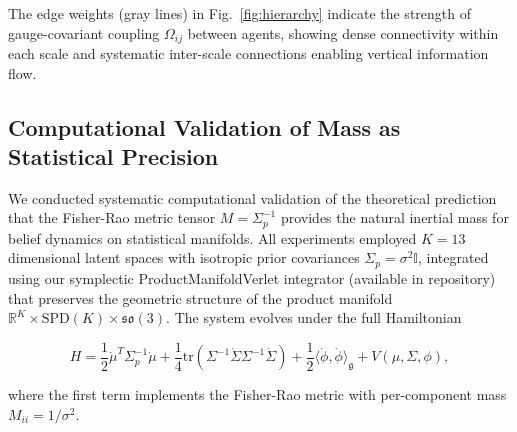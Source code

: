 \documentclass[11pt]{article}
\begin{document}
The edge weights (gray lines) in Fig.~\ref{fig:hierarchy} indicate the strength of gauge-covariant coupling $\Omega_{ij}$ between agents, showing dense connectivity within each scale and systematic inter-scale connections enabling vertical information flow.


\subsection{Computational Validation of Mass as Statistical Precision}

We conducted systematic computational validation of the theoretical prediction that the Fisher-Rao metric tensor $M = \Sigma_p^{-1}$ provides the natural inertial mass for belief dynamics on statistical manifolds. All experiments employed $K = 13$ dimensional latent spaces with isotropic prior covariances $\Sigma_p = \sigma^2 \mathbb{I}$, integrated using our symplectic ProductManifoldVerlet integrator (available in repository) that preserves the geometric structure of the product manifold $\mathbb{R}^K \times \text{SPD}(K) \times \mathfrak{so}(3)$. The system evolves under the full Hamiltonian

\begin{equation}
H = \frac{1}{2} \dot{\mu}^T \Sigma_p^{-1} \dot{\mu} + \frac{1}{4} \text{tr}(\Sigma^{-1} \dot{\Sigma} \Sigma^{-1} \dot{\Sigma}) + \frac{1}{2} \langle \dot{\phi}, \dot{\phi} \rangle_{\mathfrak{g}} + V(\mu, \Sigma, \phi),
\end{equation}

where the first term implements the Fisher-Rao metric with per-component mass $M_{ii} = 1/\sigma^2$.
\end{document}
